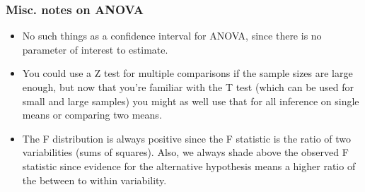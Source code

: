 \documentclass[11pt,containsverbatim,handout]{beamer}
\begin{document}
\begin{frame}
\frametitle{Misc. notes on ANOVA}

\begin{itemize}

\item No such things as a confidence interval for ANOVA, since there is no parameter of interest to estimate.

\item You could use a Z test for multiple comparisons if the sample sizes are large enough, but now that you're familiar with the T test (which can be used for small and large samples) you might as well use that for all inference on single means or comparing two means.

\item The F distribution is always positive since the F statistic is the ratio of two variabilities (sums of squares). Also, we always shade above the observed F statistic since evidence for the alternative hypothesis means a higher ratio of the between to within variability.

\end{itemize}

\end{frame}

\end{document}
